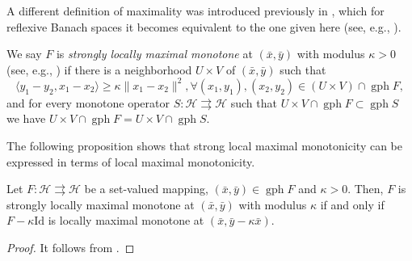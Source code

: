 \documentclass[smallextended,envcountsect,envcountsame]{svjour3}
\renewcommand{\H}{\mathcal{H}}
\newcommand{\tto}{\rightrightarrows}
\newcommand{\gph}{\operatorname{gph}}
\newcommand{\1}{\mathds{1}}
\begin{document}
	A different definition of maximality was introduced previously in \cite{MR1886225}, which for reflexive Banach spaces it becomes equivalent to the one given here (see, e.g., \cite[Theorem 8.5]{MR4769808}). 
    
		We say $F$ is \emph{strongly locally maximal monotone} at $(\bar x,\bar y)$ with modulus $\kappa>0$ (see, e.g., \cite[Definition 6.5]{MR4769808}) if there is a neighborhood $U\times V$ of $(\bar x,\bar y)$ such that $$\langle y_1-y_2,x_1-x_2\rangle\geq \kappa\|x_1-x_2\|^2, \forall (x_1,y_1),(x_2,y_2)\in (U\times V)\cap \gph F,$$ and for every monotone operator $S\colon \H\tto\H$ such that $U\times V\cap\gph F\subset \gph S$ we have $U\times V\cap\gph F=U\times V\cap\gph S$.
	
	The following proposition shows that strong local maximal monotonicity can be expressed in terms of local maximal monotonicity.
	\begin{proposition}\label{prop-slmm-lmm}
		Let $F\colon \H\tto\H$ be a set-valued mapping,  $(\bar x,\bar y)\in \gph F$ and $\kappa>0$. Then, $F$ is strongly locally maximal monotone at $(\bar x,\bar y)$ with modulus $\kappa$ if and only if $F-\kappa\text{Id}$ is locally maximal monotone at $(\bar x,\bar y-\kappa\bar x)$. 
	\end{proposition}
	\begin{proof}
		It follows from \cite[Proposition 6.7 \& Corollary 8.9]{MR4769808}. 
	\end{proof}
\end{document}
